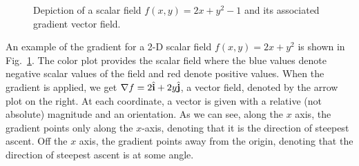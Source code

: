 \begin{figure}[!tb]
\begin{center}

\begin{subfigure}[b]{0.3\textwidth}
\end{subfigure}
\hspace{2cm}
\begin{subfigure}[b]{0.3\textwidth}
\end{subfigure}

\caption{Depiction of a scalar field $f(x,y) = 2x + y^2 - 1$ and its associated gradient vector field.}
\label{Fig:vector_gradientExample}
\end{center}
\end{figure}


An example of the gradient for a 2-D scalar field $f(x,y) = 2x + y^2$ is shown in Fig.~\ref{Fig:vector_gradientExample}. The color plot provides the scalar field where the blue values denote negative scalar values of the field and red denote positive values. When the gradient is applied, we get $\nabla f = 2 \hat{\mathbf{i}} + 2y \hat{\mathbf{j}}$, a vector field, denoted by the arrow plot on the right. At each coordinate, a vector is given with a relative (not absolute) magnitude and an orientation. As we can see, along the $x$ axis, the gradient points only along the $x$-axis, denoting that it is the direction of steepest ascent. Off the $x$ axis, the gradient points away from the origin, denoting that the direction of steepest ascent is at some angle.

